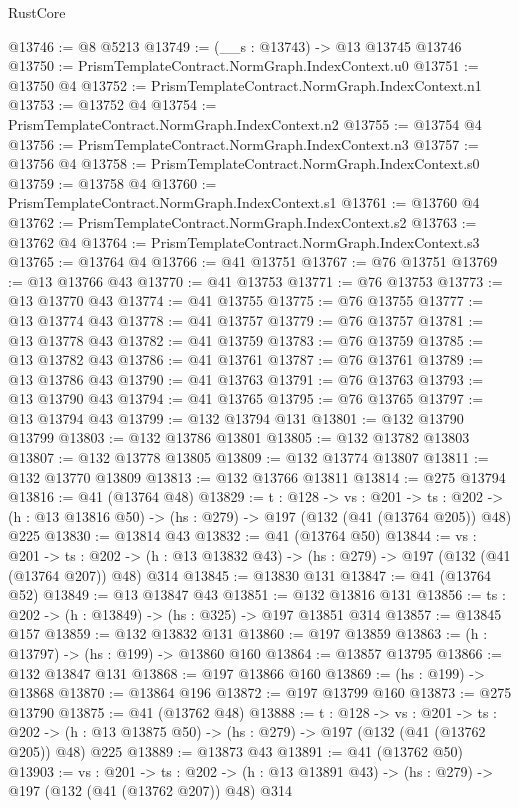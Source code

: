 \begin{lexlean}{RustCore}
\begin{coremodule}
@13746 := @8 @5213
@13749 := (__s : @13743) -> @13 @13745 @13746
@13750 := PrismTemplateContract.NormGraph.IndexContext.u0
@13751 := @13750 @4
@13752 := PrismTemplateContract.NormGraph.IndexContext.n1
@13753 := @13752 @4
@13754 := PrismTemplateContract.NormGraph.IndexContext.n2
@13755 := @13754 @4
@13756 := PrismTemplateContract.NormGraph.IndexContext.n3
@13757 := @13756 @4
@13758 := PrismTemplateContract.NormGraph.IndexContext.s0
@13759 := @13758 @4
@13760 := PrismTemplateContract.NormGraph.IndexContext.s1
@13761 := @13760 @4
@13762 := PrismTemplateContract.NormGraph.IndexContext.s2
@13763 := @13762 @4
@13764 := PrismTemplateContract.NormGraph.IndexContext.s3
@13765 := @13764 @4
@13766 := @41 @13751
@13767 := @76 @13751
@13769 := @13 @13766 @43
@13770 := @41 @13753
@13771 := @76 @13753
@13773 := @13 @13770 @43
@13774 := @41 @13755
@13775 := @76 @13755
@13777 := @13 @13774 @43
@13778 := @41 @13757
@13779 := @76 @13757
@13781 := @13 @13778 @43
@13782 := @41 @13759
@13783 := @76 @13759
@13785 := @13 @13782 @43
@13786 := @41 @13761
@13787 := @76 @13761
@13789 := @13 @13786 @43
@13790 := @41 @13763
@13791 := @76 @13763
@13793 := @13 @13790 @43
@13794 := @41 @13765
@13795 := @76 @13765
@13797 := @13 @13794 @43
@13799 := @132 @13794 @131
@13801 := @132 @13790 @13799
@13803 := @132 @13786 @13801
@13805 := @132 @13782 @13803
@13807 := @132 @13778 @13805
@13809 := @132 @13774 @13807
@13811 := @132 @13770 @13809
@13813 := @132 @13766 @13811
@13814 := @275 @13794
@13816 := @41 (@13764 @48)
@13829 := {t : @128} ->
  {vs : @201} ->
  {ts : @202} -> (h : @13 @13816 @50) -> (hs : @279) -> @197 (@132 (@41 (@13764 @205)) @48) @225
@13830 := @13814 @43
@13832 := @41 (@13764 @50)
@13844 := {vs : @201} ->
  {ts : @202} -> (h : @13 @13832 @43) -> (hs : @279) -> @197 (@132 (@41 (@13764 @207)) @48) @314
@13845 := @13830 @131
@13847 := @41 (@13764 @52)
@13849 := @13 @13847 @43
@13851 := @132 @13816 @131
@13856 := {ts : @202} -> (h : @13849) -> (hs : @325) -> @197 @13851 @314
@13857 := @13845 @157
@13859 := @132 @13832 @131
@13860 := @197 @13859
@13863 := (h : @13797) -> (hs : @199) -> @13860 @160
@13864 := @13857 @13795
@13866 := @132 @13847 @131
@13868 := @197 @13866 @160
@13869 := (hs : @199) -> @13868
@13870 := @13864 @196
@13872 := @197 @13799 @160
@13873 := @275 @13790
@13875 := @41 (@13762 @48)
@13888 := {t : @128} ->
  {vs : @201} ->
  {ts : @202} -> (h : @13 @13875 @50) -> (hs : @279) -> @197 (@132 (@41 (@13762 @205)) @48) @225
@13889 := @13873 @43
@13891 := @41 (@13762 @50)
@13903 := {vs : @201} ->
  {ts : @202} -> (h : @13 @13891 @43) -> (hs : @279) -> @197 (@132 (@41 (@13762 @207)) @48) @314

\end{coremodule}
\end{lexlean}
